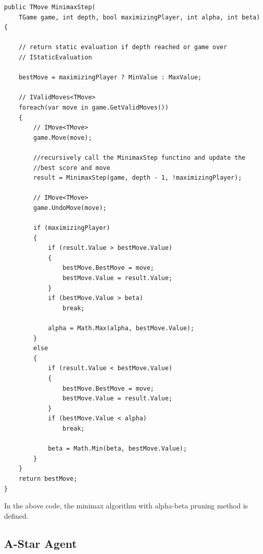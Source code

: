 \begin{lstlisting}
public TMove MinimaxStep(
    TGame game, int depth, bool maximizingPlayer, int alpha, int beta) {
    
    // return static evaluation if depth reached or game over
    // IStaticEvaluation

    bestMove = maximizingPlayer ? MinValue : MaxValue;
    
    // IValidMoves<TMove>
    foreach(var move in game.GetValidMoves())
    {
        // IMove<TMove>
        game.Move(move);

        //recursively call the MinimaxStep functino and update the
        //best score and move
        result = MinimaxStep(game, depth - 1, !maximizingPlayer);
        
        // IMove<TMove>
        game.UndoMove(move);

        if (maximizingPlayer)
        {
            if (result.Value > bestMove.Value)
            {
                bestMove.BestMove = move;
                bestMove.Value = result.Value;
            }
            if (bestMove.Value > beta)
                break;

            alpha = Math.Max(alpha, bestMove.Value);
        }
        else
        {
            if (result.Value < bestMove.Value)
            {
                bestMove.BestMove = move;
                bestMove.Value = result.Value;
            }
            if (bestMove.Value < alpha)
                break;

            beta = Math.Min(beta, bestMove.Value);
        }
    }
    return bestMove;
}
\end{lstlisting}

In the above code, the minimax algorithm with alpha-beta pruning method is defined. 

\subsection{A-Star Agent}

